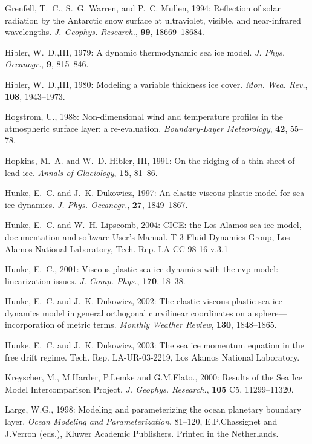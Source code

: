 Grenfell, T.~C., S.~G. Warren, and P.~C. Mullen, 1994: Reflection of solar radiation
by the Antarctic snow surface at ultraviolet, visible, and near-infrared wavelengths.
  {\it J. Geophys. Research.}, {\bf 99}, 18669--18684.

Hibler, W.~D.,III, 1979: A dynamic thermodynamic sea ice model.
  {\it J. Phys. Oceanogr.}, {\bf 9}, 815--846.

Hibler, W.~D.,III, 1980: Modeling a variable thickness ice cover.
  {\it Mon. Wea. Rev.}, {\bf 108}, 1943--1973.

Hogstrom, U., 1988: Non-dimensional wind and temperature profiles in the
atmospheric surface layer: a re-evaluation. 
  {\it Boundary-Layer Meteorology}, {\bf 42}, 55--78.

Hopkins, M.~A. and W.~D. Hibler, III, 1991: On the ridging of a thin sheet of lead ice.
  {\it Annals of Glaciology}, {\bf 15}, 81--86.

Hunke, E.~C. and J.~K. Dukowicz, 1997: An elastic-viscous-plastic model for sea
  ice dynamics. {\it J. Phys. Oceanogr.}, {\bf 27}, 1849--1867.

Hunke, E.~C. and W.~H. Lipscomb, 2004: CICE: the Los Alamos sea ice model, documentation and software
  User's Manual. T-3 Fluid Dynamics Group, Los Alamos National Laboratory, Tech. Rep. LA-CC-98-16 v.3.1

Hunke, E.~C., 2001: Viscous-plastic sea ice dynamics with the evp model: linearization issues.
  {\it J. Comp. Phys.}, {\bf 170}, 18--38.

Hunke, E.~C. and J.~K. Dukowicz, 2002: The elastic-viscous-plastic
  sea ice dynamics model in general orthogonal curvilinear coordinates
  on a sphere---incorporation of metric terms. {\it Monthly Weather Review},
  {\bf 130}, 1848--1865.

Hunke, E.~C. and J.~K. Dukowicz, 2003: The sea ice momentum equation in the free drift regime.
 Tech. Rep. LA-UR-03-2219, Los Alamos National Laboratory.

Kreyscher, M., M.Harder, P.Lemke and G.M.Flato., 2000: Results of the
  Sea Ice Model Intercomparison Project. {\it J. Geophys. Research.}, {\bf 105} 
  C5, 11299--11320.

Large, W.G., 1998: Modeling and parameterizing the ocean planetary boundary layer. 
{\it Ocean Modeling and Parameterization}, 81--120, E.P.Chassignet and J.Verron (eds.),
Kluwer Academic Publishers. Printed in the Netherlands.

